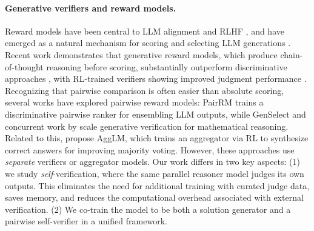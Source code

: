\paragraph{Generative verifiers and reward models.}
Reward models have been central to LLM alignment and RLHF \citep{christiano2017rlhf, ziegler2019rlhf, DBLP:journals/corr/abs-2009-01325}, and have emerged as a natural mechanism for scoring and selecting LLM generations \citep{DBLP:journals/corr/abs-2110-14168, DBLP:conf/nips/ZhengC00WZL0LXZ23}. Recent work demonstrates that generative reward models, which produce chain-of-thought reasoning before scoring, substantially outperform discriminative approaches \citep{mahan2024generative, zhang2025generativeverifiersrewardmodeling, shi2025heimdalltesttimescalinggenerative, saha2025learningplanreason}, with RL-trained verifiers showing improved judgment performance \citep{liu2025inferencetimescalinggeneralistreward, whitehouse2025j1incentivizingthinkingllmasajudge}.
Recognizing that pairwise comparison is often easier than absolute scoring, several works have explored pairwise reward models: PairRM \citep{jiang2023llmblender} trains a discriminative pairwise ranker for ensembling LLM outputs, while GenSelect \citep{toshniwal2025genselect} and concurrent work by \citet{mahdavi2025scaling} scale generative verification for mathematical reasoning. Related to this, \citet{zhao2025majority} propose AggLM, which trains an aggregator via RL to synthesize correct answers for improving majority voting.
However, these approaches use \textit{separate} verifiers or aggregator models. Our work differs in two key aspects: (1) we study \textit{self}-verification, where the same parallel reasoner model judges its own outputs. This eliminates the need for additional training with curated judge data, saves memory, and reduces the computational overhead associated with external verification. (2) We co-train the model to be both a solution generator and a pairwise self-verifier in a unified framework.

